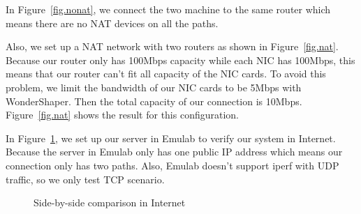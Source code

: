 In Figure~\ref{fig.nonat}, we connect the two machine to the same router which means there are no NAT devices on all the paths.

\begin{figure*}[htb]
\caption{Side-by-side comparison without NAT}
\label{fig.nonat}
\end{figure*}

Also, we set up a NAT network with two routers as shown in Figure~\ref{fig.nat}. Because our router only has 100Mbps capacity while each NIC has 100Mbps, this means that our router can't fit all capacity of the NIC cards. To avoid this problem, we limit the bandwidth of our NIC cards to be 5Mbps with WonderShaper. Then the total capacity of our connection is 10Mbps. Figure~\ref{fig.nat} shows the result for this configuration.

\begin{figure*}[htb]
\caption{Side-by-side comparison with a simple NAT}
\label{fig.nat}
\end{figure*}


In Figure~\ref{fig.net}, we set up our server in Emulab to verify our system in Internet. Because the server in Emulab only has one public IP address which means our connection only has two paths. Also, Emulab doesn't support iperf with UDP traffic, so we only test TCP scenario.

\begin{figure}[htb]
\caption{Side-by-side comparison in Internet}
\label{fig.net}
\end{figure}


%
%
